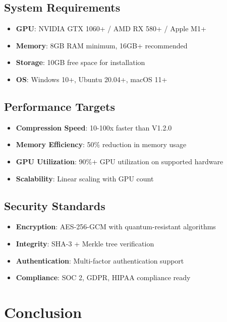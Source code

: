 \documentclass[12pt,a4paper]{article}
\begin{document}
\subsection{System Requirements}
\begin{itemize}
    \item \textbf{GPU}: NVIDIA GTX 1060+ / AMD RX 580+ / Apple M1+
    \item \textbf{Memory}: 8GB RAM minimum, 16GB+ recommended
    \item \textbf{Storage}: 10GB free space for installation
    \item \textbf{OS}: Windows 10+, Ubuntu 20.04+, macOS 11+
\end{itemize}

\subsection{Performance Targets}
\begin{itemize}
    \item \textbf{Compression Speed}: 10-100x faster than V1.2.0
    \item \textbf{Memory Efficiency}: 50\% reduction in memory usage
    \item \textbf{GPU Utilization}: 90\%+ GPU utilization on supported hardware
    \item \textbf{Scalability}: Linear scaling with GPU count
\end{itemize}

\subsection{Security Standards}
\begin{itemize}
    \item \textbf{Encryption}: AES-256-GCM with quantum-resistant algorithms
    \item \textbf{Integrity}: SHA-3 + Merkle tree verification
    \item \textbf{Authentication}: Multi-factor authentication support
    \item \textbf{Compliance}: SOC 2, GDPR, HIPAA compliance ready
\end{itemize}

\section{Conclusion}
\end{document}
